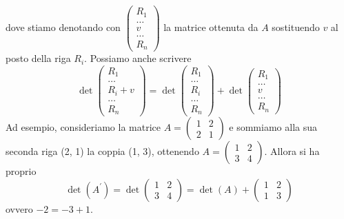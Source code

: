 \documentclass{book}
\begin{document}
\begin{enumerate}
  dove stiamo denotando con $\begin{pmatrix} R_1 \\ \dots \\ v\\ \dots \\ R_n \end{pmatrix}$ la matrice ottenuta da $A$ sostituendo $v$ al posto della riga $R_i$. Possiamo anche scrivere
  \begin{equation}
	\det\begin{pmatrix} R_1 \\ \dots \\ R_i+v\\ \dots \\ R_n \end{pmatrix}=\det\begin{pmatrix} R_1 \\ \dots \\ R_i\\ \dots \\ R_n \end{pmatrix}+\det \begin{pmatrix} R_1 \\ \dots \\ v\\ \dots \\ R_n \end{pmatrix}
  \end{equation}
  Ad esempio, consideriamo la matrice $A=\begin{pmatrix} 1 & 2 \\ 2 & 1 \end{pmatrix}$ e sommiamo
  alla sua seconda riga (2, 1) la coppia (1, 3), ottenendo  $A=\begin{pmatrix} 1 & 2 \\ 3 & 4 \end{pmatrix}$. Allora si ha proprio
  \begin{equation*}
	\det(A^\prime)=\det\begin{pmatrix} 1 & 2 \\ 3 & 4 \end{pmatrix}=\det(A)+\begin{pmatrix} 1 & 2 \\ 1 & 3 \end{pmatrix}
  \end{equation*}
  ovvero $-2=-3+1$.\\

\end{enumerate}

\printindex
\end{document}
